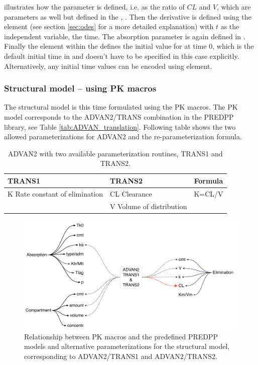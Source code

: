 illustrates how the parameter  is defined, i.e. as the ratio of $CL$ and $V$, 
which are parameters as well but defined in the , . 
Then the derivative  is defined using the element 
(see section \ref{sec:odes} for a more detailed explanation)
with $t$ as the independent variable, the time. The absorption parameter  
is again defined in .
Finally the  element within the  defines
the initial value for  at time 0, which is the default 
initial time in \pharmml and doesn't have to be specified in this case explicitly. 
Alternatively, any initial time values can be encoded using  element.


\subsubsection{Structural model -- using PK macros}
The structural model is this time formulated using the PK macros. 
The PK model corresponds to the ADVAN2/TRANS combination 
in the PREDPP library, see Table \ref{tab:ADVAN_translation}.
Following table shows the two allowed parameterizations for ADVAN2 
and the re-parameterization formula. 
\begin{table}[ht]
\centering
\renewcommand{\arraystretch}{1.1}%
\begin{tabular*}{.8\textwidth}{@{\extracolsep{\fill} } lll}
  \hline
  \hline
  TRANS1								& TRANS2						& Formula \\
  \hline
K Rate constant of elimination				& CL Clearance 					& K=CL/V \\
									& V Volume of distribution				& \\
\end{tabular*}
\caption{ADVAN2 with two available parameterization routines, TRANS1 and TRANS2.}
\end{table}
\begin{figure}[htbp]
\centering
\includegraphics[width=.8\textwidth]{pics/Advan2_Parameterizations}
\caption{Relationship between PK macros and the predefined PREDPP models and 
alternative parameterizations for the structural model, corresponding 
to ADVAN2/TRANS1 and ADVAN2/TRANS2.}
\end{figure}

